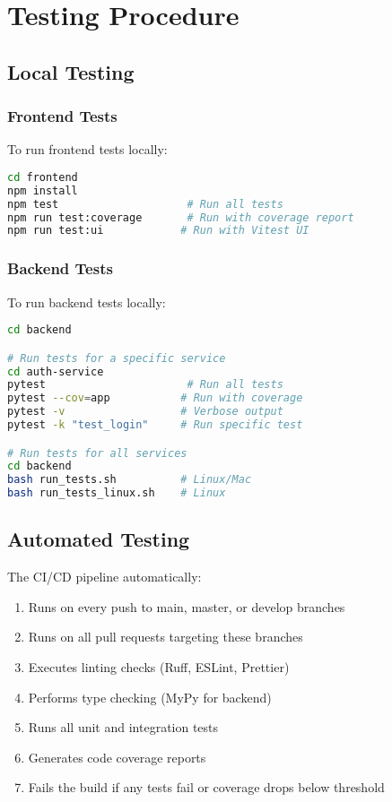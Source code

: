 \documentclass[12pt,a4paper]{article}
\begin{document}
\section{Testing Procedure}

\subsection{Local Testing}

\subsubsection{Frontend Tests}
To run frontend tests locally:

\begin{lstlisting}[language=bash]
cd frontend
npm install
npm test                    # Run all tests
npm run test:coverage       # Run with coverage report
npm run test:ui            # Run with Vitest UI
\end{lstlisting}

\subsubsection{Backend Tests}
To run backend tests locally:

\begin{lstlisting}[language=bash]
cd backend

# Run tests for a specific service
cd auth-service
pytest                      # Run all tests
pytest --cov=app           # Run with coverage
pytest -v                  # Verbose output
pytest -k "test_login"     # Run specific test

# Run tests for all services
cd backend
bash run_tests.sh          # Linux/Mac
bash run_tests_linux.sh    # Linux
\end{lstlisting}

\subsection{Automated Testing}

The CI/CD pipeline automatically:
\begin{enumerate}
    \item Runs on every push to main, master, or develop branches
    \item Runs on all pull requests targeting these branches
    \item Executes linting checks (Ruff, ESLint, Prettier)
    \item Performs type checking (MyPy for backend)
    \item Runs all unit and integration tests
    \item Generates code coverage reports
    \item Fails the build if any tests fail or coverage drops below threshold
\end{enumerate}
\end{document}
